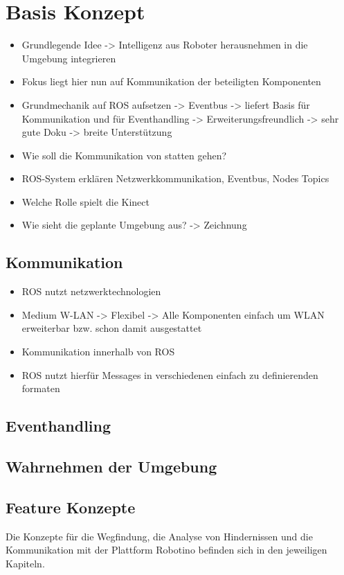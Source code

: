 \chapter{Basis Konzept}
	\begin{itemize}
	\item Grundlegende Idee -> Intelligenz aus Roboter herausnehmen in die Umgebung integrieren
	\item Fokus liegt hier nun auf Kommunikation der beteiligten Komponenten
	\item Grundmechanik auf ROS aufsetzen -> Eventbus -> liefert Basis für Kommunikation und für Eventhandling -> Erweiterungsfreundlich -> sehr gute Doku -> breite Unterstützung

	\item Wie soll die Kommunikation von statten gehen?
	\item ROS-System erklären Netzwerkkommunikation, Eventbus, Nodes Topics

	\item Welche Rolle spielt die Kinect

	\item Wie sieht die geplante Umgebung aus? -> Zeichnung
	\end{itemize}
	\section{Kommunikation}
	\begin{itemize}
	\item ROS nutzt netzwerktechnologien
	\item Medium W-LAN -> Flexibel -> Alle Komponenten einfach um WLAN erweiterbar bzw. schon damit ausgestattet
	\item Kommunikation innerhalb von ROS
	\item ROS nutzt hierfür Messages in verschiedenen einfach zu definierenden formaten
	\end{itemize}
	\section{Eventhandling}
	
	\section{Wahrnehmen der Umgebung}
	
	\section{Feature Konzepte}
	Die Konzepte für die Wegfindung, die Analyse von Hindernissen und die Kommunikation mit der Plattform Robotino befinden sich in den jeweiligen Kapiteln.